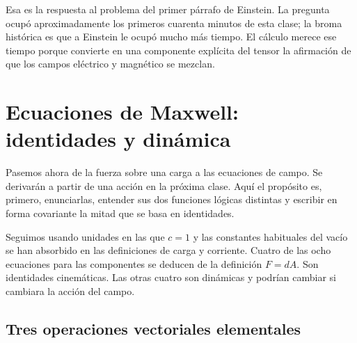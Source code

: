 Esa es la respuesta al problema del primer párrafo de Einstein. La pregunta ocupó aproximadamente los primeros cuarenta minutos de esta clase; la broma histórica es que a Einstein le ocupó mucho más tiempo. El cálculo merece ese tiempo porque convierte en una componente explícita del tensor la afirmación de que los campos eléctrico y magnético se mezclan.

\section{Ecuaciones de Maxwell: identidades y dinámica}

Pasemos ahora de la fuerza sobre una carga a las ecuaciones de campo. Se derivarán a partir de una acción en la próxima clase. Aquí el propósito es, primero, enunciarlas, entender sus dos funciones lógicas distintas y escribir en forma covariante la mitad que se basa en identidades.

\begin{classroomqa}\end{classroomqa}

\begin{classroomqa}\end{classroomqa}

Seguimos usando unidades en las que \(c=1\) y las constantes habituales del vacío se han absorbido en las definiciones de carga y corriente. Cuatro de las ocho ecuaciones para las componentes se deducen de la definición \(F=dA\). Son identidades cinemáticas. Las otras cuatro son dinámicas y podrían cambiar si cambiara la acción del campo.

\subsection{Tres operaciones vectoriales elementales}

